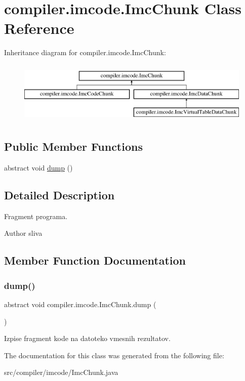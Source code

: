 \hypertarget{classcompiler_1_1imcode_1_1_imc_chunk}{}\section{compiler.\+imcode.\+Imc\+Chunk Class Reference}
\label{classcompiler_1_1imcode_1_1_imc_chunk}
Inheritance diagram for compiler.\+imcode.\+Imc\+Chunk\+:\begin{figure}[H]
\begin{center}
\leavevmode
\includegraphics[height=3.000000cm]{classcompiler_1_1imcode_1_1_imc_chunk}
\end{center}
\end{figure}
\subsection*{Public Member Functions}
\begin{DoxyCompactItemize}
\item 
abstract void \hyperlink{classcompiler_1_1imcode_1_1_imc_chunk_aa448428440d60c467424e873eb4e444d}{dump} ()
\end{DoxyCompactItemize}


\subsection{Detailed Description}
Fragment programa.

\begin{DoxyAuthor}{Author}
sliva 
\end{DoxyAuthor}


\subsection{Member Function Documentation}
\mbox{\label{classcompiler_1_1imcode_1_1_imc_chunk_aa448428440d60c467424e873eb4e444d}} 
\subsubsection{\texorpdfstring{dump()}{dump()}}
{\footnotesize\ttfamily abstract void compiler.\+imcode.\+Imc\+Chunk.\+dump (\begin{DoxyParamCaption}{ }\end{DoxyParamCaption})\hspace{0.3cm}{\ttfamily [abstract]}}

Izpise fragment kode na datoteko vmesnih rezultatov. 

The documentation for this class was generated from the following file\+:\begin{DoxyCompactItemize}
\item 
src/compiler/imcode/Imc\+Chunk.\+java\end{DoxyCompactItemize}
